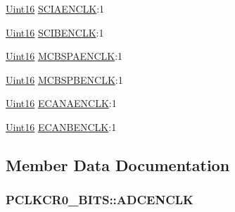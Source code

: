 \begin{DoxyCompactItemize}
\hyperlink{_d_s_p2833x___device_8h_a59a9f6be4562c327cbfb4f7e8e18f08b}{Uint16} \hyperlink{struct_p_c_l_k_c_r0___b_i_t_s_ab19261798f36ab8a7590c5c2b890c2e1}{S\+C\+I\+A\+E\+N\+C\+L\+K}\+:1
\item 
\hyperlink{_d_s_p2833x___device_8h_a59a9f6be4562c327cbfb4f7e8e18f08b}{Uint16} \hyperlink{struct_p_c_l_k_c_r0___b_i_t_s_aaab92d9248881ea14bd3e3d20fafbdb1}{S\+C\+I\+B\+E\+N\+C\+L\+K}\+:1
\item 
\hyperlink{_d_s_p2833x___device_8h_a59a9f6be4562c327cbfb4f7e8e18f08b}{Uint16} \hyperlink{struct_p_c_l_k_c_r0___b_i_t_s_a47e784ed57c84871e5fb210785337276}{M\+C\+B\+S\+P\+A\+E\+N\+C\+L\+K}\+:1
\item 
\hyperlink{_d_s_p2833x___device_8h_a59a9f6be4562c327cbfb4f7e8e18f08b}{Uint16} \hyperlink{struct_p_c_l_k_c_r0___b_i_t_s_ac58e2dee88f69d8c594a797c1557b2c4}{M\+C\+B\+S\+P\+B\+E\+N\+C\+L\+K}\+:1
\item 
\hyperlink{_d_s_p2833x___device_8h_a59a9f6be4562c327cbfb4f7e8e18f08b}{Uint16} \hyperlink{struct_p_c_l_k_c_r0___b_i_t_s_ab9ec6019ee2033f0d8fe51d624d44361}{E\+C\+A\+N\+A\+E\+N\+C\+L\+K}\+:1
\item 
\hyperlink{_d_s_p2833x___device_8h_a59a9f6be4562c327cbfb4f7e8e18f08b}{Uint16} \hyperlink{struct_p_c_l_k_c_r0___b_i_t_s_ab6eadfdca6a9a0d1d182d4ac7f82ccc8}{E\+C\+A\+N\+B\+E\+N\+C\+L\+K}\+:1
\end{DoxyCompactItemize}


\subsection{Member Data Documentation}
\hypertarget{struct_p_c_l_k_c_r0___b_i_t_s_a2cc41a325b93fcd24cb6d87b92096fd5}{}
\subsubsection[{A\+D\+C\+E\+N\+C\+L\+K}]{ P\+C\+L\+K\+C\+R0\+\_\+\+B\+I\+T\+S\+::\+A\+D\+C\+E\+N\+C\+L\+K}\label{struct_p_c_l_k_c_r0___b_i_t_s_a2cc41a325b93fcd24cb6d87b92096fd5}
\hypertarget{struct_p_c_l_k_c_r0___b_i_t_s_ab9ec6019ee2033f0d8fe51d624d44361}{}
